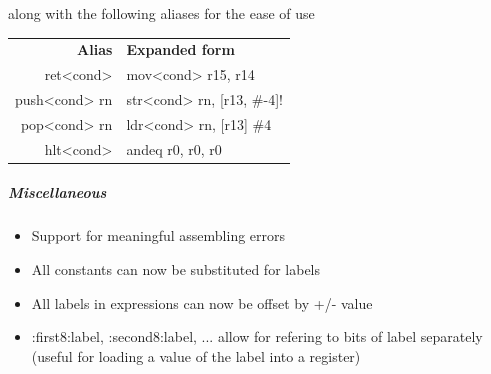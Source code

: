 \documentclass[11pt]{article}
\begin{document}
along with the following aliases for the ease of use
\begin{center}
	\begin{tabular}{r|l}
		\textbf{Alias} & \textbf{Expanded form} \\
		ret<cond> & mov<cond> r15, r14\\
		push<cond> rn & str<cond> rn, [r13, \#-4]!\\
		pop<cond> rn & ldr<cond> rn, [r13] \#4\\
		hlt<cond> & andeq r0, r0, r0
	\end{tabular}
\end{center}
\subparagraph*{Miscellaneous}
\begin{itemize}
\item Support for meaningful assembling errors
\item All constants can now be substituted for labels
\item All labels in expressions can now be offset by +/- value
\item :first8:label, :second8:label, ... allow for refering to bits of label separately (useful for loading a value of the label into a register)
\end{itemize}
\pagebreak
\end{document}
